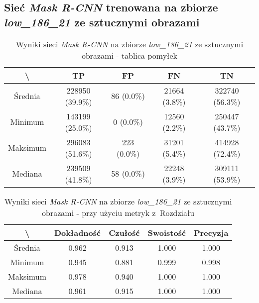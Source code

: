\subsection{Sieć \textit{Mask R-CNN} trenowana na zbiorze \textit{low\_186\_21} ze sztucznymi obrazami}
\label{sec:results_low_original_generated}

\begin{table}[H]
	\centering
	\caption{Wyniki sieci \textit{Mask R-CNN} na zbiorze \textit{low\_186\_21} ze sztucznymi obrazami - tablica pomyłek}
	\vspace{6pt}
	{\footnotesize
		\begin{tabular}{|c|c|c|c|c|}
      \hline \textbackslash & TP & FP & FN & TN \\
      \hline Średnia & 228950 (39.9\%) & 86 (0.0\%) & 21664 (3.8\%) & 322740 (56.3\%) \\
      \hline Minimum & 143199 (25.0\%) & 0 (0.0\%) & 12560 (2.2\%) & 250447 (43.7\%) \\
      \hline Maksimum & 296083 (51.6\%) & 223 (0.0\%) & 31201 (5.4\%) & 414928 (72.4\%) \\
      \hline Mediana & 239509 (41.8\%) & 58 (0.0\%) & 22248 (3.9\%) & 309111 (53.9\%) \\
      \hline
		\end{tabular}
	}
  \vspace{0pt}
  \label{Tab:low_original_generated}
\end{table}


\begin{table}[H]
	\centering
	\caption{Wyniki sieci \textit{Mask R-CNN} na zbiorze \textit{low\_186\_21} ze sztucznymi obrazami - przy użyciu metryk z~Rozdziału }
	\vspace{6pt}
	{\footnotesize
		\begin{tabular}{|c|c|c|c|c|}
      \hline \textbackslash & Dokładność & Czułość & Swoistość & Precyzja \\
      \hline Średnia & 0.962 & 0.913 & 1.000 & 1.000 \\
      \hline Minimum & 0.945 & 0.881 & 0.999 & 0.998 \\
      \hline Maksimum & 0.978 & 0.940 & 1.000 & 1.000 \\
      \hline Mediana & 0.961 & 0.915 & 1.000 & 1.000 \\
      \hline
		\end{tabular}
	}
  \vspace{0pt}
  \label{Tab:low_original_generated_calculated}
\end{table}

